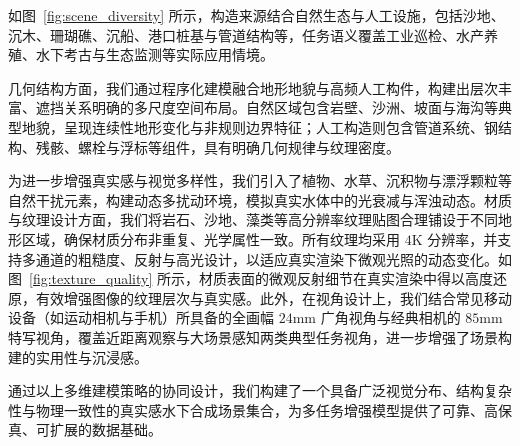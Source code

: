 \documentclass[twocolumn]{article}
\begin{document}
如图~\ref{fig:scene_diversity} 所示，构造来源结合自然生态与人工设施，包括沙地、沉木、珊瑚礁、沉船、港口桩基与管道结构等，任务语义覆盖工业巡检、水产养殖、水下考古与生态监测等实际应用情境。


几何结构方面，我们通过程序化建模融合地形地貌与高频人工构件，构建出层次丰富、遮挡关系明确的多尺度空间布局。自然区域包含岩壁、沙洲、坡面与海沟等典型地貌，呈现连续性地形变化与非规则边界特征；人工构造则包含管道系统、钢结构、残骸、螺栓与浮标等组件，具有明确几何规律与纹理密度。

为进一步增强真实感与视觉多样性，我们引入了植物、水草、沉积物与漂浮颗粒等自然干扰元素，构建动态多扰动环境，模拟真实水体中的光衰减与浑浊动态。材质与纹理设计方面，我们将岩石、沙地、藻类等高分辨率纹理贴图合理铺设于不同地形区域，确保材质分布非重复、光学属性一致。所有纹理均采用 $4\mathrm{K}$ 分辨率，并支持多通道的粗糙度、反射与高光设计，以适应真实渲染下微观光照的动态变化。如图~\ref{fig:texture_quality} 所示，材质表面的微观反射细节在真实渲染中得以高度还原，有效增强图像的纹理层次与真实感。此外，在视角设计上，我们结合常见移动设备（如运动相机与手机）所具备的全画幅 $24\mathrm{mm}$ 广角视角与经典相机的 $85\mathrm{mm}$ 特写视角，覆盖近距离观察与大场景感知两类典型任务视角，进一步增强了场景构建的实用性与沉浸感。



通过以上多维建模策略的协同设计，我们构建了一个具备广泛视觉分布、结构复杂性与物理一致性的真实感水下合成场景集合，为多任务增强模型提供了可靠、高保真、可扩展的数据基础。
\end{document}
